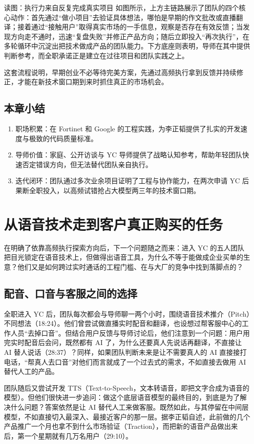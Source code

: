 \documentclass[UTF8,a4paper,11pt,fontset=fandol]{ctexart}
\begin{document}
\begin{knowledgebox}{读图：执行力来自反复完成真实项目}
如图所示，上方主链路展示了团队的四个核心动作：首先通过“做小项目”去验证具体想法，哪怕是早期的作文批改或直播翻译；接着通过“接触用户”取得真实市场的一手信息，观察是否存在有效反馈；当发现方向走不通时，迅速“复盘失败”并修正产品方向；随后立即投入“再次执行”，在多轮循环中沉淀出把技术做成产品的团队能力。下方底座则表明，导师在其中提供判断参考，而全职承诺正是建立在过往项目和团队实践之上。
\end{knowledgebox}
这套流程说明，早期创业不必等待完美方案，先通过高频执行拿到反馈并持续修正，才能在新技术窗口期到来时抓住真正的市场机会。
\subsection{本章小结}
\begin{enumerate}
\item 职场积累：在 Fortinet 和 Google 的工程实践，为李正韬提供了扎实的开发速度与极致的代码质量标准。
\item 导师价值：家庭、公开访谈与 YC 导师提供了战略认知参考，帮助年轻团队快速否定错误方向，但无法替代团队亲自执行。
\item 迭代闭环：团队通过多次业余项目证明了工程与协作能力，在两次申请 YC 后果断全职投入，以高频试错抢占大模型两三年的技术窗口期。
\end{enumerate}
\section{从语音技术走到客户真正购买的任务}
在明确了依靠高频执行探索方向后，下一个问题随之而来：进入 YC 的五人团队把目光锁定在语音技术上，但做得出语音工具，为什么不等于能做成企业买单的生意？他们又是如何跨过实时通话的工程门槛、在与大厂的竞争中找到落脚点的？
\subsection{配音、口音与客服之间的选择}
全职进入 YC 后，团队每次都会与导师聊一两个小时，围绕语音技术推介（Pitch）不同想法（18:24）。他们曾尝试做直播实时配音和翻译，也设想过帮客服中心的工作人员“去掉口音”。但结合用户反馈与导师讨论后，他们注意到一个问题：用户用完实时配音后会问，既然都有 AI 了，为什么还要真人先说话再翻译，不直接让 AI 替人说话（28:37）？同样，如果团队判断未来是让不需要真人的 AI 直接接打电话，“帮真人去口音”对他们而言就成了一个过去式的需求，不如直接去做用 AI 替代人工的产品。

团队随后又尝试开发 TTS（Text-to-Speech，文本转语音，即把文字合成为语音的模型）。但他们很快进一步追问：做这个底层语音模型的最终目的，到底是为了解决什么问题？答案依然是让 AI 替代人工来做客服。既然如此，与其停留在中间层模型，不如直接切入最深入、最接近客户的那一层。据李正韬自述，此前做的几个产品推广一个月也拿不到什么市场验证（Traction），而把新的语音产品做出来后，第一个星期就有几万名用户（29:10）。
\end{document}

